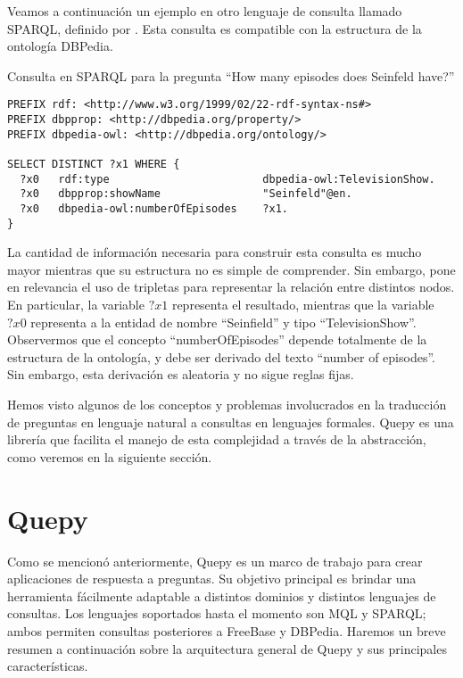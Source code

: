 Veamos a continuación un ejemplo en otro lenguaje de consulta llamado SPARQL, definido por \citet{sparql}. Esta consulta es compatible con la estructura de la ontología DBPedia.

\begin{example} Consulta en SPARQL para la pregunta ``How many episodes does Seinfeld have?''
\begin{lstlisting}
PREFIX rdf: <http://www.w3.org/1999/02/22-rdf-syntax-ns#>
PREFIX dbpprop: <http://dbpedia.org/property/>
PREFIX dbpedia-owl: <http://dbpedia.org/ontology/>

SELECT DISTINCT ?x1 WHERE {
  ?x0   rdf:type                        dbpedia-owl:TelevisionShow.
  ?x0   dbpprop:showName                "Seinfeld"@en.
  ?x0   dbpedia-owl:numberOfEpisodes    ?x1.
}
\end{lstlisting}
\end{example}

La cantidad de información necesaria para construir esta consulta es mucho mayor mientras que su estructura no es simple de comprender. Sin embargo, pone en relevancia el uso de tripletas para representar la relación entre distintos nodos. En particular, la variable $?x1$ representa el resultado, mientras que la variable $?x0$ representa a la entidad de nombre ``Seinfield'' y tipo ``TelevisionShow''. Observermos que el concepto ``numberOfEpisodes'' depende totalmente de la estructura de la ontología, y debe ser derivado del texto ``number of episodes''. Sin embargo, esta derivación es aleatoria y no sigue reglas fijas.

Hemos visto algunos de los conceptos y problemas involucrados en la traducción de preguntas en lenguaje natural a consultas en lenguajes formales. Quepy es una librería que facilita el manejo de esta complejidad a través de la abstracción, como veremos en la siguiente sección.


\section{Quepy}

Como se mencionó anteriormente, Quepy es un marco de trabajo para crear aplicaciones de respuesta a preguntas. Su objetivo principal es brindar una herramienta fácilmente adaptable a distintos dominios y distintos lenguajes de consultas. Los lenguajes soportados hasta el momento son MQL y SPARQL; ambos permiten consultas posteriores a FreeBase y DBPedia. Haremos un breve resumen a continuación sobre la arquitectura general de Quepy y sus principales características.

